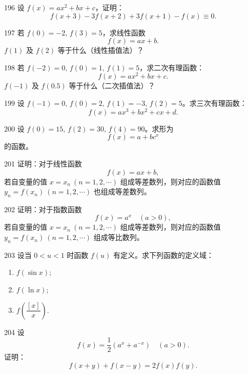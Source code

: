 \begin{prob}[M]{196}
设 $f(x) = ax^2 + bx + c$，证明：
\[
f(x + 3) - 3f(x + 2) + 3f(x + 1) - f(x) \equiv 0.
\]
\end{prob}

\begin{prob}[M]{197}
若 $f(0) = -2,\, f(3) = 5$，求线性函数
\[
f(x) = ax + b.
\]
$f(1)$ 及 $f(2)$ 等于什么（线性插值法）？
\end{prob}

\begin{prob}[M]{198}
若 $f(-2) = 0,\, f(0) = 1,\, f(1) = 5$，求二次有理函数：
\[
f(x) = ax^2 + bx + c.
\]
$f(-1)$ 及 $f(0.5)$ 等于什么（二次插值法）？
\end{prob}

\begin{prob}[M]{199}
设 $f(-1) = 0,\, f(0) = 2,\, f(1) = -3,\, f(2) = 5$。求三次有理函数：
\[
f(x) = ax^3 + bx^2 + cx + d.
\]
\end{prob}

\begin{prob}[M]{200}
设 $f(0) = 15,\, f(2) = 30,\, f(4) = 90$。求形为
\[
f(x) = a + bc^x
\]
的函数。
\end{prob}

\begin{prob}[M]{201}
证明：对于线性函数
\[
f(x) = ax + b,
\]
若自变量的值 $x = x_n\ (n = 1, 2, \cdots)$ 组成等差数列，则对应的函数值 $y_n = f(x_n)\ (n = 1, 2, \cdots)$ 也组成等差数列。
\end{prob}

\begin{prob}[M]{202}
证明：对于指数函数
\[
f(x) = a^x \quad (a > 0),
\]
若自变量的值 $x = x_n\ (n = 1, 2, \cdots)$ 组成等差数列，则对应的函数值 $y_n = f(x_n)\ (n = 1, 2, \cdots)$ 组成等比数列。
\end{prob}

\begin{prob}[L]{203}
设当 $0 < u < 1$ 时函数 $f(u)$ 有定义。求下列函数的定义域：
\begin{enumerate}[label=(\alph*), itemsep=2pt, topsep=3pt]
\item $f(\sin x)$;
\item $f(\ln x)$;
\item $f\!\left(\dfrac{[x]}{x}\right)$.
\end{enumerate}
\end{prob}

\begin{prob}[M]{204}
设
\[
f(x) = \frac{1}{2}(a^x + a^{-x}) \quad (a > 0).
\]
证明：
\[
f(x + y) + f(x - y) = 2f(x)f(y).
\]
\end{prob}

